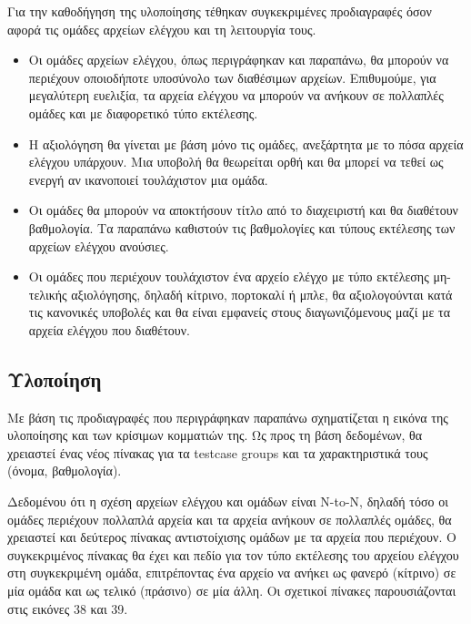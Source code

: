 \documentclass[diploma]{softlab-thesis}
\begin{document}
Για την καθοδήγηση της υλοποίησης τέθηκαν συγκεκριμένες προδιαγραφές όσον
αφορά τις ομάδες αρχείων ελέγχου και τη λειτουργία τους.

\begin{itemize}

    \item Οι ομάδες αρχείων ελέγχου, όπως περιγράφηκαν και παραπάνω, θα μπορούν
      να περιέχουν οποιοδήποτε υποσύνολο των διαθέσιμων αρχείων. Επιθυμούμε,
      για μεγαλύτερη ευελιξία, τα αρχεία ελέγχου να μπορούν να ανήκουν σε
      πολλαπλές ομάδες και με διαφορετικό τύπο εκτέλεσης.

    \item Η αξιολόγηση θα γίνεται με βάση μόνο τις ομάδες, ανεξάρτητα με το
      πόσα αρχεία ελέγχου υπάρχουν. Μια υποβολή θα θεωρείται ορθή και θα μπορεί
      να τεθεί ως ενεργή αν ικανοποιεί τουλάχιστον μια ομάδα.

    \item Οι ομάδες θα μπορούν να αποκτήσουν τίτλο από το διαχειριστή και θα
      διαθέτουν βαθμολογία. Τα παραπάνω καθιστούν τις βαθμολογίες και τύπους
      εκτέλεσης των αρχείων ελέγχου ανούσιες.

    \item Οι ομάδες που περιέχουν τουλάχιστον ένα αρχείο ελέγχο με τύπο εκτέλεσης
      μη-τελικής αξιολόγησης, δηλαδή κίτρινο, πορτοκαλί ή μπλε, θα αξιολογούνται
      κατά τις κανονικές υποβολές και θα είναι εμφανείς στους διαγωνιζόμενους
      μαζί με τα αρχεία ελέγχου που διαθέτουν.

\end{itemize}

\subsection{Υλοποίηση}

Με βάση τις προδιαγραφές που περιγράφηκαν παραπάνω σχηματίζεται η εικόνα της
υλοποίησης και των κρίσιμων κομματιών της. Ως προς τη βάση δεδομένων, θα
χρειαστεί ένας νέος πίνακας για τα testcase groups και τα χαρακτηριστικά τους
(όνομα, βαθμολογία).

\bigskip

Δεδομένου ότι η σχέση αρχείων ελέγχου και ομάδων είναι N-to-N, δηλαδή τόσο οι
ομάδες περιέχουν πολλαπλά αρχεία και τα αρχεία ανήκουν σε πολλαπλές ομάδες, θα
χρειαστεί και δεύτερος πίνακας αντιστοίχισης ομάδων με τα αρχεία που περιέχουν.
Ο συγκεκριμένος πίνακας θα έχει και πεδίο για τον τύπο εκτέλεσης του αρχείου
ελέγχου στη συγκεκριμένη ομάδα, επιτρέποντας ένα αρχείο να ανήκει ως φανερό
(κίτρινο) σε μία ομάδα και ως τελικό (πράσινο) σε μία άλλη. Οι σχετικοί πίνακες
παρουσιάζονται στις εικόνες 38 και 39.
\end{document}
